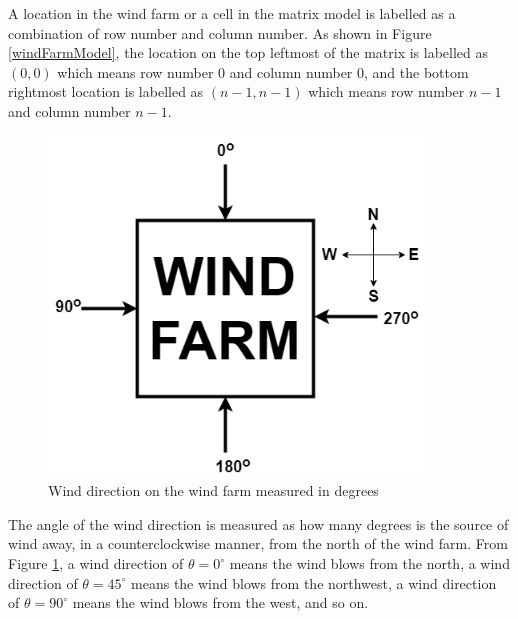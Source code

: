     A location in the wind farm or a cell in the matrix model is labelled as a combination of row number and column number. As shown in Figure \ref{windFarmModel}, the location on the top leftmost of the matrix is labelled as $(0,0)$ which means row number 0 and column number 0, and the bottom rightmost location is labelled as $(n-1,n-1)$ which means row number $n-1$ and column number $n-1$.
    
    \begin{figure}[h]
        \centering
        \includegraphics[width=100mm]{Figures/windDirection.png}
        \caption{Wind direction on the wind farm measured in degrees}
        \label{windDirection}
    \end{figure}
    
    The angle of the wind direction is measured as how many degrees is the source of wind away, in a counterclockwise manner, from the north of the wind farm. From Figure \ref{windDirection}, a wind direction of $\theta=0^\circ$ means the wind blows from the north, a wind direction of $\theta=45^\circ$ means the wind blows from the northwest, a wind direction of $\theta=90^\circ$ means the wind blows from the west, and so on.
    
            
